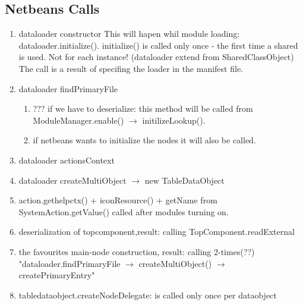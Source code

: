 \documentclass[12pt]{article}
\begin{document}
\subsection{Netbeans Calls}
\begin{enumerate}
   \item{dataloader constructor}
    This will hapen whil module loading: dataloader.initialize().
    initialize() is called only once - the first time a shared is used. 
    Not for each instance!  (dataloader extend from SharedClassObject)
    The call is a result of specifing the loader in the manifest file.
   \item{dataloader findPrimaryFile}
	\begin{enumerate}
	\item ??? if we have to deserialize: this method will be
            called from ModuleManager.enable() $\rightarrow$ initilizeLookup().
   	\item if netbeans wants to initialize the nodes it will also be called.
	\end{enumerate}
   \item dataloader actionsContext
   \item dataloader createMultiObject $\rightarrow$ new TableDataObject
   \item action.gethelpctx() + iconResource() + getName from SystemAction.getValue() called after modules turning on.
   \item deserialization of topcomponent,result: calling TopComponent.readExternal
   \item the favourites main-node construction,	result: calling 2-times(??) "dataloader.findPrimaryFile $\rightarrow$ createMultiObject()	$\rightarrow$ createPrimaryEntry"
   \item tabledataobject.createNodeDelegate: is called only once per dataobject
\end{enumerate}
\end{document}

